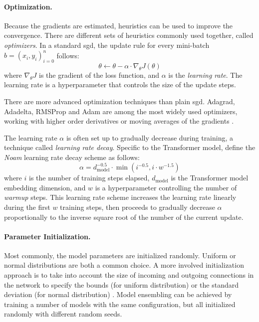 \paragraph{Optimization.}
Because the gradients are estimated, heuristics can be used to improve the
convergence. There are different sets of heuristics commonly used together,
called \emph{optimizers}. In a standard \ac{sgd}, the update rule for every
mini-batch $b = (x_i, y_i)_{i=0}^{n}$ follows:
%
\begin{equation}
  \theta \gets \theta - \alpha  \cdot \nabla_{\theta}  J(\theta)
\end{equation}
%
where $\nabla_{\theta} J$ is the gradient of the loss function, and
$\alpha$ is the \emph{learning rate}. The learning rate is a hyperparameter
that controls the size of the update steps.

There are more advanced optimization techniques than plain \ac{sgd}. Adagrad,
Adadelta, RMSProp and Adam are among the most widely used optimizers, working
with higher order derivatives or moving averages of the gradients
\citep{duchi2011adaptive,zeiler2012adadelta,tieleman2012lecture,kingma2014adam}.

The learning rate $\alpha$ is often set up to gradually decrease during
training, a technique called \emph{learning rate decay}. Specific to the
Transformer model, \citet{vaswani2017attention} define the \emph{Noam} learning
rate decay scheme as follows:
%
\begin{equation}
  \alpha =  d_{\text{model}}^{-0.5} \cdot \min( i^{-0.5}, i \cdot  w^{-1.5})
\end{equation}
%
where $i$ is the number of training steps elapsed, $d_{\text{model}}$ is the
Transformer model embedding dimension, and $w$ is a hyperparameter controlling
the number of \emph{warmup} steps. This learning rate scheme increases the
learning rate linearly during the first $w$ training steps, then proceeds to
gradually decrease $\alpha$ proportionally to the inverse square root of the
number of the current update. 

\paragraph{Parameter Initialization.}
Most commonly, the model parameters are initialized randomly. Uniform or normal
distributions are both a common choice. A more involved initialization approach
is to take into account the size of incoming and outgoing connections in the
network to specify the bounds (for uniform distribution) or the standard
deviation (for normal distribution) \citep{glorot2010understanding}.
Model ensembling can be achieved by training a number of models with the same
configuration, but all initialized randomly with different random seeds.

